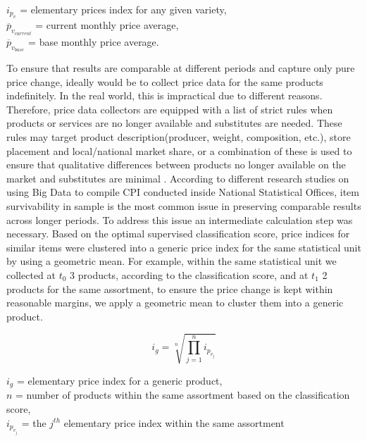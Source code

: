 \documentclass[]{article}
\begin{document}
\begin{center}	
	$i_{p_{v}}$ = elementary prices index for any given variety, \\
	$\overline{p}_{v_{current}}$ = current monthly price average, \\
	$\overline{p}_{v_{base}}$ = base monthly price average.
\end{center} 

To ensure that results are comparable at different periods and capture only pure price change, ideally would be to collect price data for the same products indefinitely\cite{cpi2}. In the real world, this is impractical due to different reasons. Therefore, price data collectors are equipped with a list of strict rules when products or services are no longer available and substitutes are needed. These rules may target product description(producer, weight, composition, etc.), store placement and local/national market share, or a combination of these is used to ensure that qualitative differences between products no longer available on the market and substitutes are minimal \cite{cpi}. According to different research studies on using Big Data to compile CPI conducted inside National Statistical Offices, item survivability in sample is the most common issue in preserving comparable results across longer periods\cite{ons2017, willenborg2017, tranzitivity, kints}. To address this issue an intermediate calculation step was necessary. Based on the optimal supervised classification score, price indices for similar items were clustered into a generic price index for the same statistical unit by using a geometric mean. For example, within the same statistical unit we collected at $t_{0}$ 3 products, according to the classification score, and at $t_{1}$ 2 products for the same assortment, to ensure the price change is kept within reasonable margins, we apply a geometric mean to cluster them into a generic product.   

\begin{equation}\label{eq:3}
i_{g} = \sqrt[n]{\prod_{j=1}^{n} i_{p_{v_{j}}}}
\end{equation}

\begin{center}
	$i_{g}$ = elementary price index for a generic product, \\
	$n$ = number of products within the same assortment based on the classification score, \\
	$i_{p_{v_{j}}}$ = the $j^{th}$ elementary price index within the same assortment
\end{center}
\end{document}
